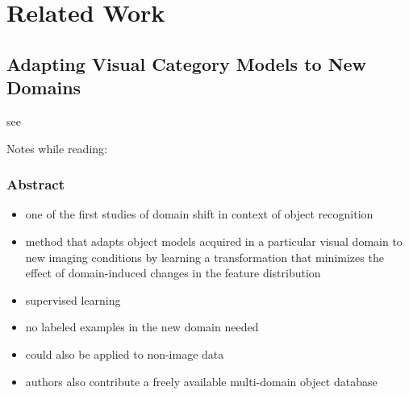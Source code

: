 \chapter{Related Work}
\label{sec:related_work}

\section{Adapting Visual Category Models to New Domains}

see \cite{10.1007/978-3-642-15561-1_16}

Notes while reading:
\subsection{Abstract}
\begin{itemize}
	\item one of the first studies of domain shift in context of object recognition
	\item method that adapts object models acquired in a particular visual domain to new imaging conditions by learning a transformation that minimizes the effect of domain-induced changes in the feature distribution 
	\item supervised learning
	\item no labeled examples in the new domain needed
	\item could also be applied to non-image data
	\item authors also contribute a freely available multi-domain object database
\end{itemize}

